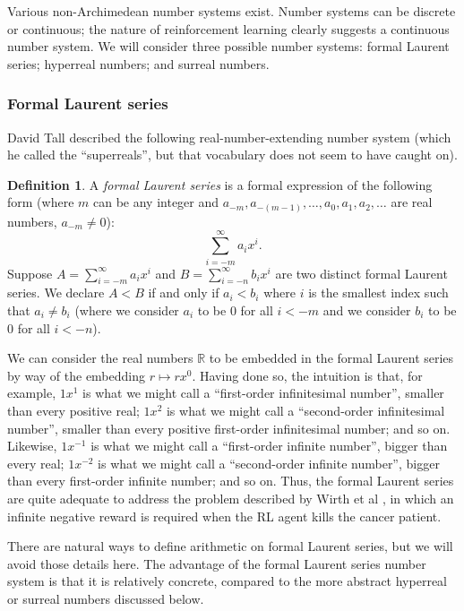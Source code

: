 \documentclass[reqno]{article}
\theoremstyle{definition}
\newtheorem{definition}{Definition}
\begin{document}
Various non-Archimedean number systems exist. Number systems can be
discrete or continuous; the nature of reinforcement learning clearly
suggests a continuous number system. We will consider three possible
number systems: formal Laurent series; hyperreal numbers; and
surreal numbers.

\subsubsection{Formal Laurent series}

David Tall described \cite{tall1980looking} the following
real-number-extending number system (which he called the ``superreals'', but
that vocabulary does not seem to have caught on).

\begin{definition}
A \emph{formal Laurent series} is a formal expression of the following form
(where $m$ can be any integer and $a_{-m},a_{-(m-1)},\ldots,a_0,a_1,a_2,\ldots$
are real numbers, $a_{-m}\not=0$):
\[
\sum_{i=-m}^\infty a_i x^i.
\]
Suppose $A=\sum_{i=-m}^\infty a_ix^i$
and $B=\sum_{i=-n}^\infty b_ix^i$ are two distinct formal Laurent series.
We declare $A<B$ if and only if $a_i<b_i$ where $i$ is the smallest
index such that $a_i\not=b_i$ (where we consider $a_i$ to be $0$ for all
$i<-m$ and we consider $b_i$ to be $0$ for all $i<-n$).
\end{definition}

We can consider the real numbers $\mathbb R$ to be embedded in the formal Laurent
series by way of the embedding $r\mapsto rx^0$. Having done so, the intuition is that,
for example, $1x^1$ is what we might call a ``first-order infinitesimal number'', smaller
than every positive real;
$1x^2$ is what we might call a ``second-order infinitesimal number'', smaller than every
positive first-order infinitesimal number; and so on. Likewise,
$1x^{-1}$ is what we might call a ``first-order infinite number'', bigger than
every real; $1x^{-2}$ is what we might call a ``second-order infinite number'', bigger
than every first-order infinite number; and so on. Thus, the formal Laurent series are
quite adequate to address the problem described by
Wirth et al \cite{wirth2017survey}, in which an infinite negative reward is required when the
RL agent kills the cancer patient.

There are natural ways to define arithmetic on formal Laurent series, but we will
avoid those details here.
The advantage of the formal Laurent series number system is that it is
relatively concrete, compared to the more abstract hyperreal or surreal numbers
discussed below.
\end{document}
